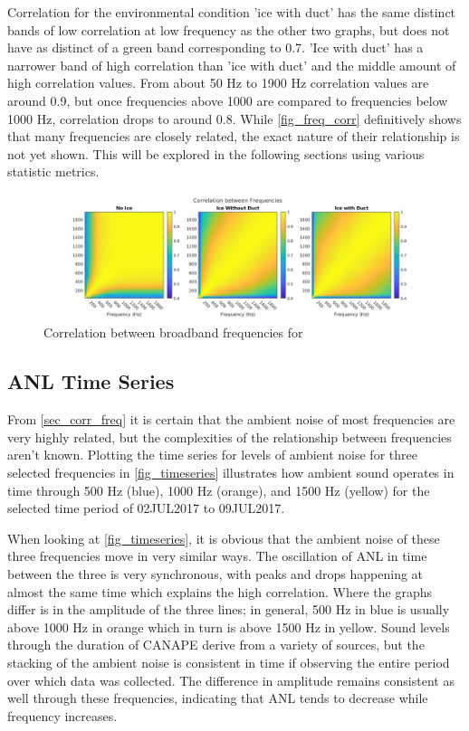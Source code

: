 Correlation for the environmental condition 'ice with duct' has the same distinct bands of low correlation at low frequency as the other two graphs, but does not have as distinct of a green band corresponding to 0.7. 'Ice with duct' has a narrower band of high correlation than 'ice with duct' and the middle amount of high correlation values. From about 50 Hz to 1900 Hz correlation values are around 0.9, but once frequencies above 1000 are compared to frequencies below 1000 Hz, correlation drops to around 0.8. While \autoref{fig_freq_corr} definitively shows that many frequencies are closely related, the exact nature of their relationship is not yet shown. This will be explored in the following sections using various statistic metrics.

\begin{figure}[ht]
\centering
\includegraphics[scale=0.35]{Figures/corr_all_1x3.jpg}
\caption{Correlation between broadband frequencies for }
\label{fig_freq_corr}
\end{figure}

\subsection{ANL Time Series}\label{sec_timeseries}

From \autoref{sec_corr_freq} it is certain that the ambient noise of most frequencies are very highly related, but the complexities of the relationship between frequencies aren't known. Plotting the time series for levels of ambient noise for three selected frequencies in \autoref{fig_timeseries} illustrates how ambient sound operates in time through 500 Hz (blue), 1000 Hz (orange), and 1500 Hz (yellow) for the selected time period of 02JUL2017 to 09JUL2017. %

When looking at \autoref{fig_timeseries}, it is obvious that the ambient noise of these three frequencies move in very similar ways. The oscillation of ANL in time between the three is very synchronous, with peaks and drops happening at almost the same time which explains the high correlation. Where the graphs differ is in the amplitude of the three lines; in general, 500 Hz in blue is usually above 1000 Hz in orange which in turn is above 1500 Hz in yellow. Sound levels through the duration of CANAPE derive from a variety of sources, but the stacking of the ambient noise is consistent in time if observing the entire period over which data was collected. The difference in amplitude remains consistent as well through these frequencies, indicating that ANL tends to decrease while frequency increases. 

